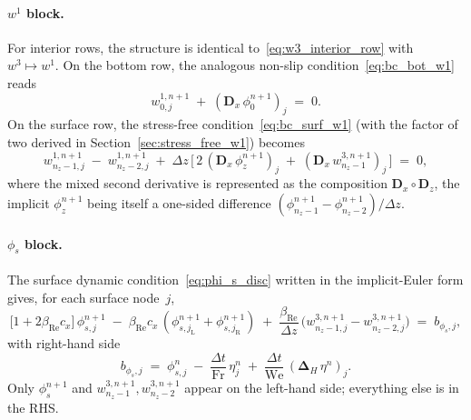 \documentclass{article}
\newcommand{\Fr}{\mathrm{Fr}}
\newcommand{\We}{\mathrm{We}}
\newcommand{\Rey}{\mathrm{Re}}
\begin{document}
\paragraph{$w^1$ block.}
For interior rows, the structure is identical to~\eqref{eq:w3_interior_row} with $w^3 \mapsto w^1$.
On the bottom row, the analogous non-slip condition~\eqref{eq:bc_bot_w1} reads
\begin{equation}
    w^{1,n+1}_{0, j} \;+\; (\bm{D}_x\,\phi^{n+1}_{0})_j \;=\; 0. \label{eq:w1_bottom_row}
\end{equation}
On the surface row, the stress-free condition~\eqref{eq:bc_surf_w1} (with the factor of two derived in Section~\ref{sec:stress_free_w1}) becomes
\begin{equation}
    w^{1,n+1}_{n_z-1, j} \;-\; w^{1,n+1}_{n_z-2, j} \;+\; \Delta z\,\big[\,2\,(\bm{D}_x\,\phi_z^{n+1})_j \;+\; (\bm{D}_x\,w^{3,n+1}_{n_z-1})_j\,\big] \;=\; 0, \label{eq:w1_surface_row}
\end{equation}
where the mixed second derivative is represented as the composition $\bm{D}_x \circ \bm{D}_z$, the implicit $\phi_z^{n+1}$ being itself a one-sided difference $(\phi^{n+1}_{n_z-1} - \phi^{n+1}_{n_z-2})/\Delta z$.

\paragraph{$\phi_s$ block.}
The surface dynamic condition~\eqref{eq:phi_s_disc} written in the implicit-Euler form gives, for each surface node~$j$,
\begin{equation}
    \big[1 + 2\beta_{\Rey} c_x\big]\,\phi_{s,j}^{n+1} \;-\; \beta_{\Rey} c_x\,(\phi_{s,j_{\mathrm{L}}}^{n+1} + \phi_{s,j_{\mathrm{R}}}^{n+1}) \;+\; \frac{\beta_{\Rey}}{\Delta z}\,\big(w^{3,n+1}_{n_z-1, j} - w^{3,n+1}_{n_z-2, j}\big) \;=\; b_{\phi_s, j}, \label{eq:phi_s_row}
\end{equation}
with right-hand side
\begin{equation}
    b_{\phi_s, j} \;=\; \phi_{s,j}^{n} \;-\; \frac{\Delta t}{\Fr}\,\eta_j^n \;+\; \frac{\Delta t}{\We}\,(\bm{\Delta}_H\,\eta^n)_j. \label{eq:phi_s_rhs}
\end{equation}
Only $\phi_s^{n+1}$ and $w^{3,n+1}_{n_z-1}, w^{3,n+1}_{n_z-2}$ appear on the left-hand side; everything else is in the RHS.
\end{document}
